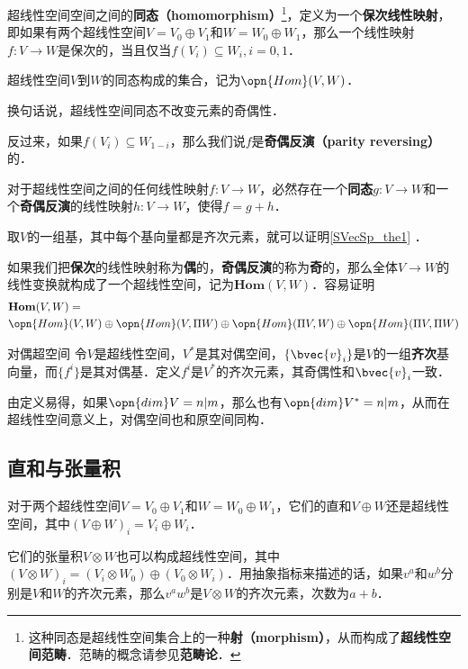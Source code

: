 超线性空间空间之间的\textbf{同态（homomorphism）}\footnote{这种同态是超线性空间集合上的一种\textbf{射（morphism）}，从而构成了\textbf{超线性空间范畴}．范畴的概念请参见\textbf{范畴论}．}，定义为一个\textbf{保次线性映射}，即如果有两个超线性空间$V=V_0\oplus V_1$和$W=W_0\oplus W_1$，那么一个线性映射$f:V\to W$是保次的，当且仅当$f(V_i)\subseteq W_i, i=0, 1$．

\begin{definition}{}
超线性空间$V$到$W$的同态构成的集合，记为$\opn{Hom}(V, W)$．
\end{definition}

换句话说，超线性空间同态不改变元素的奇偶性．

反过来，如果$f(V_i)\subseteq W_{1-i}$，那么我们说$f$是\textbf{奇偶反演（parity reversing）}的．

\begin{theorem}{}\label{SVecSp_the1}
对于超线性空间之间的任何线性映射$f:V\to W$，必然存在一个\textbf{同态}$g:V\to W$和一个\textbf{奇偶反演}的线性映射$h:V\to W$，使得$f=g+h$．
\end{theorem}

取$V$的一组基，其中每个基向量都是齐次元素，就可以证明\autoref{SVecSp_the1} ．

如果我们把\textbf{保次}的线性映射称为\textbf{偶}的，\textbf{奇偶反演}的称为\textbf{奇}的，那么全体$V\to W$的线性变换就构成了一个超线性空间，记为$\mathbf{Hom}(V, W)$．容易证明
\begin{equation}
\begin{aligned}
&\mathbf{Hom}(V, W)=\\&\opn{Hom}(V, W)\oplus\opn{Hom}(V, \Pi W)\oplus\opn{Hom}(\Pi V, W)\oplus\opn{Hom}(\Pi V, \Pi W)
\end{aligned}
\end{equation}

\begin{definition}{对偶超空间}
令$V$是超线性空间，$V^*$是其对偶空间，$\{\bvec{v}_i\}$是$V$的一组\textbf{齐次}基向量，而$\{f^i\}$是其对偶基．定义$f^i$是$V^*$的齐次元素，其奇偶性和$\bvec{v}_i$一致．
\end{definition}

由定义易得，如果$\opn{dim}V=n|m$，那么也有$\opn{dim}V^*=n|m$，从而在超线性空间意义上，对偶空间也和原空间同构．


\subsection{直和与张量积}

对于两个超线性空间$V=V_0\oplus V_1$和$W=W_0\oplus W_1$，它们的直和$V\oplus W$还是超线性空间，其中$(V\oplus W)_i=V_i\oplus W_i$．

它们的张量积$V\otimes W$也可以构成超线性空间，其中$(V\otimes W)_i=(V_i\otimes W_0)\oplus(V_0\otimes W_i)$．用抽象指标来描述的话，如果$v^a$和$w^b$分别是$V$和$W$的齐次元素，那么$v^aw^b$是$V\otimes W$的齐次元素，次数为$a+b$．























